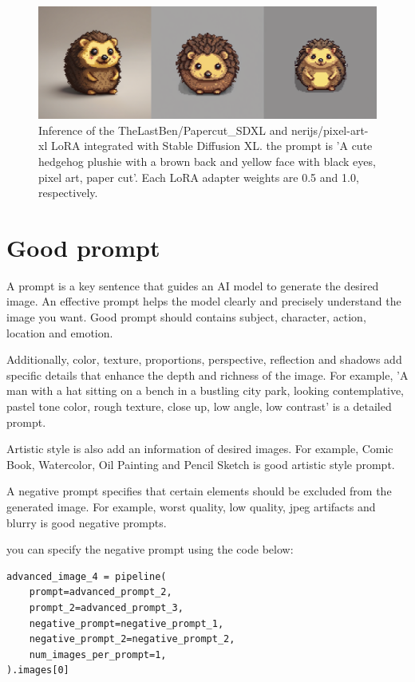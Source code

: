 \documentclass[extendedabs]{bmvc2k}
\begin{document}
\begin{figure}[t]
\centering
	\includegraphics[width=\linewidth]{images/xlpixel.png}
    
    
	\caption{
		Inference of the TheLastBen/Papercut\_SDXL and nerijs/pixel-art-xl LoRA integrated with Stable Diffusion XL. the prompt is 'A cute hedgehog plushie with a brown back and yellow face with black eyes, pixel art, paper cut'. Each LoRA adapter weights are 0.5 and 1.0, respectively.}
	\vspace{-2mm}
        \label{fig:loraxlresult3}
\end{figure}
\section{Good prompt}
A prompt is a key sentence that guides an AI model to generate the desired image. An effective prompt helps the model clearly and precisely understand the image you want. Good prompt should contains subject, character, action, location and emotion. 

Additionally, color, texture, proportions, perspective, reflection and shadows add specific details that enhance the depth and richness of the image. For example, 'A man with a hat sitting on a bench in a bustling city park, looking contemplative, pastel tone color, rough texture, close up, low angle, low contrast' is a detailed prompt.

Artistic style is also add an information of desired images. For example, Comic Book, Watercolor, Oil Painting and Pencil Sketch is good artistic style prompt.

A negative prompt specifies that certain elements should be excluded from the generated image. For example, worst quality, low quality, jpeg artifacts and blurry is good negative prompts.

you can specify the negative prompt using the code below: 
\begin{verbatim}
advanced_image_4 = pipeline(
    prompt=advanced_prompt_2,
    prompt_2=advanced_prompt_3,
    negative_prompt=negative_prompt_1,
    negative_prompt_2=negative_prompt_2,
    num_images_per_prompt=1,
).images[0]

\end{verbatim}
\end{document}
